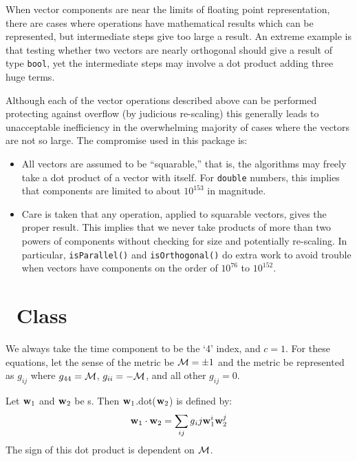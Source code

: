 When vector components are near the limits of floating point representation,
there are cases where operations have mathematical results which can be
represented, but intermediate steps give too large a result.  An extreme
example is that testing whether two vectors are nearly orthogonal should give
a result of type \verb$bool$, yet the intermediate steps may involve a dot
product adding three huge terms.

\noindent
Although each of the vector operations described above can be performed
protecting against overflow (by judicious re-scaling) this generally leads
to unacceptable inefficiency in the overwhelming majority of cases where the
vectors are not so large.  The compromise used in this package is:

\begin{itemize}
\item All vectors are assumed to be ``squarable,'' that is, the algorithms
may freely take a dot product of a vector with itself.  For \verb$double$
numbers, this implies that components are limited to about $10^{153}$
in magnitude.
\item Care is taken that any operation, applied to squarable vectors, gives
the proper result.  This implies that we never take products of more than two
powers of components without checking for size and potentially re-scaling.
In particular, {\tt isParallel()} and {\tt isOrthogonal()} do extra work 
to avoid trouble when vectors have components on the order of $10^{76}$ to
$10^{152}$. 
\end{itemize}

\section{\protect\LV\ Class}

We always take the time component to be the `4' index, and $c = 1$.
For these equations, let the sense of the metric be $ {\cal M} = \pm 1$ and
the metric be represented as $g_{ij}$ where $g_{44} = {\cal M}$,
$g_{ii} = -{\cal M}$, and all other $g_{ij} = 0$.

\noindent
Let ${\bf w}_{1}$ and ${\bf w}_{2}$ be \LV s.
Then ${\bf w}_{1}$.dot(${\bf w}_{2}$) is defined by:
\begin{equation}
\label{eq:wdot}
  {\bf w}_{1} \cdot {\bf w}_{2} = \sum_{ij} g{_ij}
{\bf w}_{1}^{i} {\bf w}_{2}^{j} \\
\end{equation}
\noindent
The sign of this dot product is dependent on $\cal M$.

